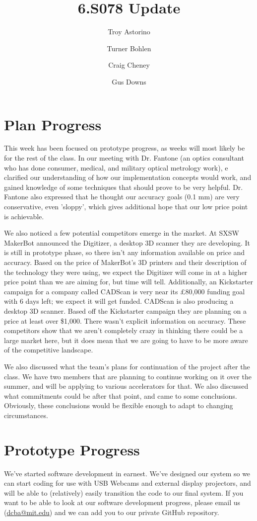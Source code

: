 \documentclass[10pt]{article}
\title{\vspace{-4em}6.S078 Update}
\author{Troy Astorino \and Turner Bohlen \and Craig Cheney \and Gus Downs}
\begin{document}
\maketitle
\vspace{-4em}

\section{Plan Progress}
This week has been focused on prototype progress, as weeks will most likely be
for the rest of the class.  In our meeting with Dr. Fantone (an optics
consultant who has done consumer, medical, and military optical metrology work),
e clarified our understanding of how our implementation concepts would work, and
gained knowledge of some techniques that should prove to be very helpful. Dr. Fantone
also expressed that he thought our accuracy goals (0.1 mm) are very
conservative, even 'sloppy', which gives additional hope that our low price
point is achievable.  

We also noticed a few potential competitors emerge in the market.  At SXSW
MakerBot announced the Digitizer, a desktop 3D scanner they are developing.  It
is still in prototype phase, so there isn't any information available on price
and accuracy.  Based on the price of MakerBot's 3D printers and their
description of the technology they were using, we expect the Digitizer will come
in at a higher price point than we are aiming for, but time will tell.
Additionally, an Kickstarter campaign for a company called CADScan is very near
its \pounds 80,000 funding goal with 6 days left; we expect it will get funded.
CADScan is also producing a desktop 3D scanner. Based off the Kickstarter
campaign they are planning on a price at least over \$1,000. There wasn't
explicit information on accuracy. These competitors show that we aren't
completely crazy in thinking there could be a large market here, but it does
mean that we are going to have to be more aware of the competitive landscape.

We also discussed what the team's plans for continuation of the project after
the class. We have two members that are planning to continue working on it over
the summer, and will be applying to various accelerators for that.  We also
discussed what commitments could be after that point, and came to some
conclusions. Obviously, these conclusions would be flexible enough to adapt to
changing circumstances.

\section{Prototype Progress}
We've started software development in earnest. We've designed our system so we
can start coding for use with USB Webcams and external display projectors, and
will be able to (relatively) easily transition the code to our final system. If
you want to be able to look at our software development progress, please email us
(\href{mailto:dcba@mit.edu}{dcba@mit.edu}) and we can add you to our private GitHub repository.
\end{document}
